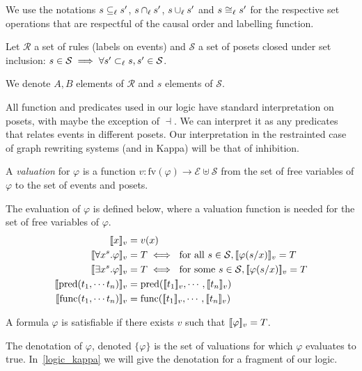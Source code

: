 
We use the notations $s \subseteq_{\ell}s'$, $s\cap_{\ell}s'$, $s\cup_{\ell}s'$ and $s\cong_{\ell}s'$ for the respective set operations that are respectful of the causal order and labelling function.

Let $\mathcal{R}$ a set of rules (labels on events) and $\mathcal{S}$ a set of posets closed under set inclusion: $s\in \mathcal{S} \implies \forall s'\subset_{\ell} s, s'\in\mathcal{S}$.

We denote $A,B$ elements of $\mathcal{R}$ and $s$ elements of $\mathcal{S}$.

All function and predicates used in our logic have standard interpretation on posets, with maybe the exception of $\dashv$. We can interpret it as any predicates that relates events in different posets. Our interpretation in the restrainted case of graph rewriting systems (and in Kappa) will be that of inhibition.

A \emph{valuation} for $\varphi$ is a function
$v:\text{fv}(\varphi)\to\mathcal{E}\uplus\mathcal{S}$
from the set of free variables of $\varphi$ to the set of events and posets.

The evaluation of $\varphi$ is defined below, where a valuation function is needed for the set of free variables of $\varphi$.
\begin{align*}
  \enc{x}_{v} &= v(x)\\
  \enc{\forall x^s.\varphi}_{v} &= T \iff\text{ for all }s\in\mathcal{S}, \enc{\varphi(s/x)}_{v} = T\\
  \enc{\exists x^s.\varphi}_{v} &= T \iff\text{ for some }s\in\mathcal{S}, \enc{\varphi(s/x)}_{v} = T\\
  \enc{\text{pred}(t_1,\cdots t_n)}_{v} &= \text{pred}(\enc{t_1}_{v},\cdots,\enc{t_n}_{v}) \\
  \enc{\text{func}(t_1,\cdots t_n)}_{v} &= \text{func}(\enc{t_1}_{v},\cdots,\enc{t_n}_{v}) \\
\end{align*}

A formula $\varphi$ is satisfiable if there exists $v$ such that $[\![\varphi]\!]_v = T$.

The denotation of $\varphi$, denoted $\{\varphi\}$ is the set of valuations for which $\varphi$ evaluates to true. In~\autoref{logic_kappa} we will give the denotation for a fragment of our logic.
